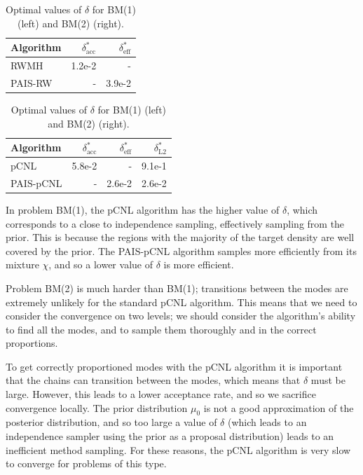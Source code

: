 \documentclass[final]{siamltex}
\begin{document}
\begin{table}[!htb]
    \begin{minipage}{.5\linewidth}
      \centering
        \begin{tabular}{|l|r|r|}
	\hline
	Algorithm							& $\delta^*_{\text{acc}}$	& $\delta^*_{\text{eff}}$ \\ \hline
	RWMH								& 1.2e-2					& - \\
	PAIS-RW								& -						& 3.9e-2\\
	\hline
	\end{tabular}
    \end{minipage}%
    \begin{minipage}{.5\linewidth}
      \centering
        \begin{tabular}{|l|r|r|r|}
	\hline
	Algorithm							& $\delta^*_{\text{acc}}$	& $\delta^*_{\text{eff}}$	& $\delta^*_{\text{L2}}$ \\ \hline
	pCNL								& 5.8e-2					& - 						& 9.1e-1\\
	PAIS-pCNL							& -						& 2.6e-2 					& 2.6e-2\\
	\hline
	\end{tabular}
    \end{minipage}
	\caption{Optimal values of $\delta$ for BM(1) (left) and BM(2) (right).}
	\label{table:BM_opt_delta}
\end{table}

In problem BM(1), the pCNL algorithm has the
higher value of $\delta$, which corresponds to a close to independence
sampling, effectively sampling from the prior. This is because the
regions with the majority of the target density are well covered by
the prior. The PAIS-pCNL algorithm samples more efficiently from its
mixture $\chi$, and so a lower value of $\delta$ is more efficient.

Problem BM(2) is much harder than BM(1); transitions between the modes
are extremely unlikely for the standard pCNL algorithm. This means that we need to consider the
convergence on two levels; we should consider the algorithm's ability
to find all the modes, and to sample them thoroughly and in the correct proportions.

To get correctly proportioned modes with the pCNL algorithm it is
important that the chains can transition between the modes, which
means that $\delta$ must be large. However, this leads to a lower
acceptance rate, and so we sacrifice convergence locally. The prior distribution $\mu_0$ is
not a good approximation of the posterior distribution, and so too
large a value of $\delta$ (which leads to an independence sampler
using the prior as a proposal distribution) leads to an inefficient
method sampling. For these reasons, the pCNL algorithm is very slow to
converge for problems of this type.
\end{document}
